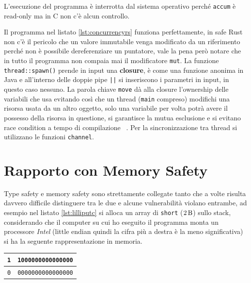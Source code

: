 \documentclass[Lau,binding=0.6cm]{sapthesis}
\newcommand{\textcode}[1]{\colorbox{backcolour}{\texttt{#1}}}
\begin{document}
L'esecuzione del programma è interrotta dal sistema operativo perché \textcode{accum} è read-only ma in C non c'è alcun controllo.




Il programma nel listato \ref{lst:concurrencyrs} funziona perfettamente, in safe Rust non c'è il pericolo che un valore immutabile venga modificato da un riferimento perché non è possibile dereferenziare un puntatore, vale la pena però notare che in tutto il programma non compaia mai il modificatore \textcode{mut}. La funzione \textcode{thread::spawn()} prende in input una \textbf{closure}, è come una funzione anonima in Java e all'interno delle doppie pipe \textcode{||} si inseriscono i parametri in input, in questo caso nessuno. 
La parola chiave \textcode{move} dà alla closure l'ownership delle variabili che usa evitando così che un thread (\textcode{main} compreso) modifichi una risorsa usata da un altro oggetto, solo una variabile per volta potrà avere il possesso della risorsa in questione, si garantisce la mutua esclusione e si evitano race condition a tempo di compilazione ~\cite[5.6]{rust:language_2}. 
Per la sincronizzazione tra thread si utilizzano le funzioni \colorbox{backcolour}{\texttt{channel}}. 




\section{Rapporto con Memory Safety}
Type safety e memory safety sono strettamente collegate tanto che a volte risulta davvero difficile distinguere tra le due e alcune vulnerabilità violano entrambe, ad esempio nel listato \ref{lst:lilliputc} si alloca un array di \textcode{short} ($ \SI{2}{\byte} $) sullo stack, considerando che il computer su cui ho eseguito il programma monta un processore \textit{Intel} (little endian quindi la cifra più a destra è la meno significativa) si ha la seguente rappresentazione in memoria.

\begin{table}[H]
	\label{fig:mem_type_stack}
	\centering
	\begin{tabular}{|c|c|}
		\hline
		\texttt{1} & \texttt{1000000000000000} \\
		\hline 
		\texttt{0} & \texttt{0000000000000000} \\
		\hline
	\end{tabular}
\end{table}
\end{document}
